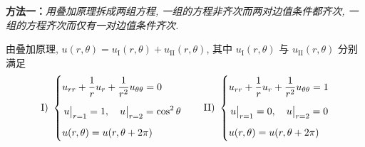 \begin{solution}
\textbf{方法一：}\emph{用叠加原理拆成两组方程, 一组的方程非齐次而两对边值条件都齐次, 一组的方程齐次而仅有一对边值条件齐次.}

由叠加原理, $u(r,\theta) = u_{\text{I}}(r,\theta) + u_{\text{II}}(r,\theta)$, 其中 $u_{\textrm{I}}(r,\theta)$ 与 $u_{\textrm{II}}(r,\theta)$ 分别满足
\[
	\text{I) }\left\{\begin{aligned}
		& u_{rr} + \dfrac 1r u_r + \dfrac{1}{r^2} u_{\theta \theta} = 0 \\[5pt]
		& \eval[1]{u}_{r = 1} = 1,\quad \eval[1]{u}_{r = 2} = \cos^2 \theta \\[5pt]
		& u(r,\theta) = u(r,\theta + 2\pi)
	\end{aligned}\right.
	\qquad
	\text{II) }\left\{\begin{aligned}
		& u_{rr} + \dfrac 1r u_r + \dfrac{1}{r^2} u_{\theta \theta} = 1 \\[5pt]
		& \eval[1]{u}_{r = 1} = 0,\quad \eval[1]{u}_{r = 2} = 0 \\[5pt]
		& u(r,\theta) = u(r,\theta + 2\pi)
	\end{aligned}\right.
\]


\end{solution}
